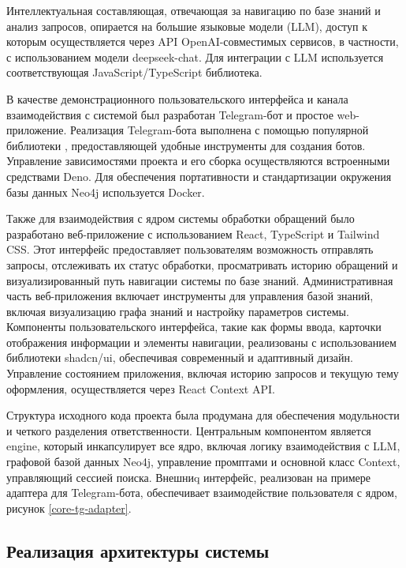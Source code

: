 Интеллектуальная составляющая, отвечающая за навигацию по базе знаний и анализ запросов, опирается на большие языковые модели (LLM), доступ к которым осуществляется через API OpenAI-совместимых сервисов\cite{openaiApi}, в частности, с использованием модели deepseek-chat\cite{deepseekApiDocs}. Для интеграции с LLM используется соответствующая JavaScript/TypeScript библиотека.

В качестве демонстрационного пользовательского интерфейса и канала взаимодействия с системой был разработан Telegram-бот и простое web-приложение. Реализация Telegram-бота выполнена с помощью популярной библиотеки \cite{grammY}, предоставляющей удобные инструменты для создания ботов. Управление зависимостями проекта и его сборка осуществляются встроенными средствами Deno. Для обеспечения портативности и стандартизации окружения базы данных Neo4j используется Docker.


Также для взаимодействия с ядром системы обработки обращений было разработано веб-приложение с использованием React, TypeScript и Tailwind CSS\cite{tailwind}. Этот интерфейс предоставляет пользователям возможность отправлять запросы, отслеживать их статус обработки, просматривать историю обращений и визуализированный путь навигации системы по базе знаний. Административная часть веб-приложения включает инструменты для управления базой знаний, включая визуализацию графа знаний и настройку параметров системы. Компоненты пользовательского интерфейса, такие как формы ввода, карточки отображения информации и элементы навигации, реализованы с использованием библиотеки shadcn/ui\cite{shadcn}, обеспечивая современный и адаптивный дизайн. Управление состоянием приложения, включая историю запросов и текущую тему оформления, осуществляется через React Context API.

Структура исходного кода проекта была продумана для обеспечения модульности и четкого разделения ответственности. Центральным компонентом является engine, который инкапсулирует все ядро, включая логику взаимодействия с LLM, графовой базой данных Neo4j, управление промптами и основной класс Context, управляющий сессией поиска. Внешниq интерфейс, реализован на примере адаптера для Telegram-бота, обеспечивает взаимодействие пользователя с ядром, рисунок \ref{core-tg-adapter}. 

\subsection{Реализация архитектуры системы}

